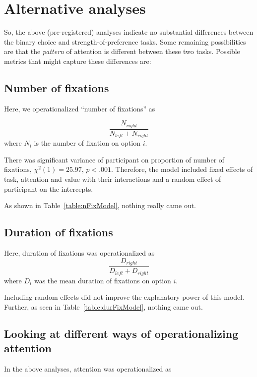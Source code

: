 \documentclass[12pt]{article}
\begin{document}
\newpage
\section{Alternative analyses}
So, the above (pre-registered) analyses indicate no substantial differences between the binary choice and strength-of-preference tasks. Some remaining possibilities are that the \emph{pattern} of attention is different between these two tasks. Possible metrics that might capture these differences are:

\subsection{Number of fixations}
Here, we operationalized ``number of fixations'' as 

\begin{equation}
	\frac{N_{right}}{N_{left}+N_{right}}
\end{equation}
where $N_i$ is the number of fixation on option $i$. 

There was significant variance of participant on proportion of number of fixations, $\chi^2(1)=25.97$, $p<.001$. Therefore, the model included fixed effects of task, attention and value with their interactions and a random effect of participant on the intercepts. 



As shown in Table~\ref{table:nFixModel}, nothing really came out. 

\subsection{Duration of fixations}
Here, duration of fixations was operationalized as 
\begin{equation}
	\frac{D_{right}}{D_{left} + D_{right}}
\end{equation}
where $D_i$ was the mean duration of fixations on option $i$. 

Including random effects did not improve the explanatory power of this model. Further, as seen in Table~\ref{table:durFixModel}, nothing came out. 



\clearpage
\newpage
\subsection{Looking at different ways of operationalizing attention}
In the above analyses, attention was operationalized as 
\end{document}
